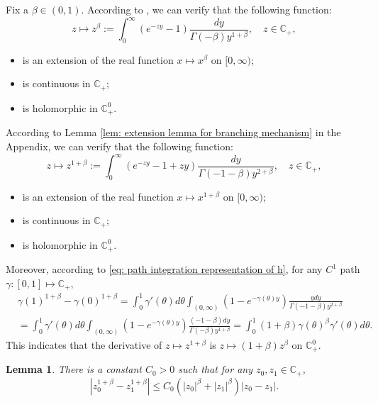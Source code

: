 \documentclass[12pt, a4paper]{amsart}
\newtheorem{lem}[thm]{Lemma}
\theoremstyle{definition}
\numberwithin{equation}{section}
\begin{document}
    Fix a $\beta \in (0,1)$.
    According to \cite[Theorem 3.2. \& Theorem 3.5.]{SchillingSongVondracek2010Bernstein}, we can verify that the following function:
\begin{equation}
    z
    \mapsto z^{\beta}
    := \int_0^\infty (e^{-zy}-1) \frac{dy}{\Gamma(-\beta)y^{1+\beta}}, 
    \quad z\in \mathbb C_+,
\end{equation}
\begin{itemize}
\item
    is an extension of the real function $x\mapsto x^{\beta}$ on $[0,\infty)$;
\item
    is continuous in $\mathbb C_+$;
\item 
    is holomorphic in $\mathbb C_+^0$.
\end{itemize}
    According to Lemma \ref{lem: extension lemma for branching mechanism} in the Appendix, we can verify that the following function:
\begin{equation}
\label{eq: stable branching on C+}
    z\mapsto 
    z^{1+\beta} 
    := \int_0^\infty (e^{-zy}-1+zy)\frac{dy}{\Gamma(-1-\beta)y^{2+\beta}},
    \quad z\in \mathbb C_+,
\end{equation}
\begin{itemize}
\item
    is an extension of the real function $x\mapsto x^{1+\beta}$ on $[0,\infty)$;
\item
    is continuous in $\mathbb C_+$;
\item 
    is holomorphic in $\mathbb C_+^0$.
\end{itemize}
    Moreover, according to \eqref{eq: path integration representation of h}, for any $C^1$ path $\gamma:[0,1]\mapsto \mathbb C_+$,
\begin{align}
\label{eq: integration formula for 1+beta-th power of z}
    &\gamma(1)^{1+\beta} - \gamma(0)^{1+\beta} 
    = \int_0^1 \gamma'(\theta)d\theta \int_{(0,\infty)}(1-e^{-\gamma(\theta)y})\frac{ydy}{\Gamma(-1-\beta)y^{2+\beta}}
    \\&=\int_0^1 \gamma'(\theta)d\theta \int_{(0,\infty)}(1-e^{-\gamma(\theta)y})\frac{(-1-\beta)dy}{\Gamma(-\beta)y^{1+\beta}} 
    = \int_0^1 (1+\beta) \gamma(\theta)^{\beta} \gamma'(\theta)d\theta.
\end{align}
    This indicates that the derivative of $z\mapsto z^{1+\beta}$ is $z\mapsto (1+\beta)z^{\beta}$ on $\mathbb C^0_+$.
\begin{lem}
\label{lem: Lip of power function}
    There is a constant $C_0 > 0$ such that for any $z_0,z_1 \in \mathbb C_+$,
\[
    |z_0^{1+\beta} - z_1^{1+\beta}| 
    \leq C_0(|z_0|^{\beta}+|z_1|^{\beta})|z_0 - z_1|.
\]
\end{lem}
\end{document}
